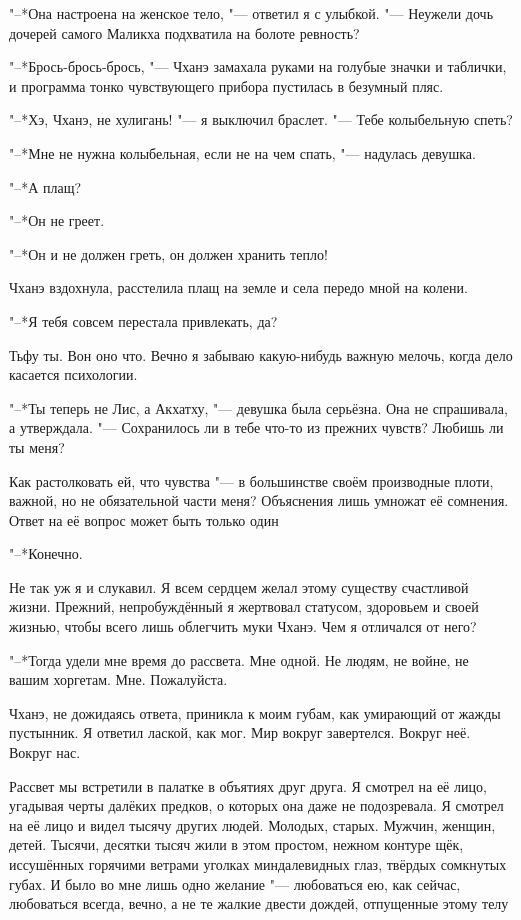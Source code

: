 \documentclass[a4paper,10pt]{book}
\newcommand{\ldotst}{\so{...}\xspace}
\begin{document}
"--*Она настроена на женское тело, "--- ответил я с улыбкой. "--- Неужели дочь 
дочерей самого Маликха подхватила на болоте ревность?

"--*Брось-брось-брось, "--- Чханэ замахала руками на голубые значки и таблички, 
и программа тонко чувствующего прибора пустилась в безумный пляс.

"--*Хэ, Чханэ, не хулигань! "--- я выключил браслет. "--- Тебе колыбельную 
спеть?

"--*Мне не нужна колыбельная, если не на чем спать, "--- надулась девушка.

"--*А плащ?

"--*Он не греет.

"--*Он и не должен греть, он должен хранить тепло!

Чханэ вздохнула, расстелила плащ на земле и села передо мной на колени.

"--*Я тебя совсем перестала привлекать, да?

Тьфу ты. Вон оно что. Вечно я забываю какую-нибудь важную мелочь, когда дело 
касается психологии.

"--*Ты теперь не Лис, а Акхатху, "--- девушка была серьёзна. Она не спрашивала, 
а утверждала. "--- Сохранилось ли в тебе что-то из прежних чувств? Любишь ли ты 
меня?

Как растолковать ей, что чувства "--- в большинстве своём производные плоти, 
важной,
но не обязательной части меня? Объяснения лишь умножат её сомнения. Ответ на её 
вопрос может быть только один\ldotst

"--*Конечно.

Не так уж я и слукавил. Я всем сердцем желал этому существу счастливой жизни. 
Прежний, непробуждённый я жертвовал статусом, здоровьем и своей жизнью, чтобы 
всего лишь облегчить муки Чханэ. Чем я отличался от него?

"--*Тогда удели мне время до рассвета. Мне одной. Не людям, не войне, не вашим 
хоргетам. Мне. Пожалуйста.

Чханэ, не дожидаясь ответа, приникла к моим губам, как умирающий от жажды 
пустынник. Я ответил лаской, как мог. Мир вокруг завертелся. Вокруг неё. Вокруг 
нас.

Рассвет мы встретили в палатке в объятиях друг друга. Я смотрел на её лицо, 
угадывая черты далёких предков, о которых она даже не подозревала. Я смотрел на 
её лицо и видел тысячу других людей. Молодых, старых. Мужчин, женщин, детей. 
Тысячи, десятки тысяч жили в этом простом, нежном контуре щёк, иссушённых 
горячими ветрами уголках миндалевидных глаз, твёрдых сомкнутых губах. И было во 
мне лишь одно желание "--- любоваться ею, как сейчас, любоваться всегда, вечно, 
а не те жалкие двести дождей, отпущенные этому телу\ldotst
\end{document}
